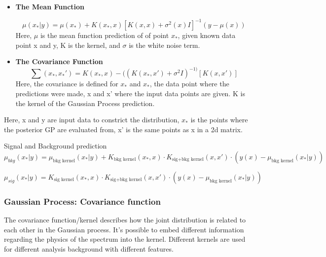     \begin{itemize}

        \item \textbf{The Mean Function}

    \begin{equation}
        \mu(x_{*}|y)  = \mu(x_{*})+ K(x_{*}, x)[K(x, x)+ \sigma^{2}(x)I]^{-1}(y-\mu(x))
    \end{equation}
    Here, $\mu$ is the mean function prediction of of point $x_{*}$, given known data point x and y, K is the kernel, and $\sigma$ is the white noise term.

    \item \textbf{The Covariance Function}
    \begin{equation}
        \sum(x_{*}, x_{*}') = K(x_{*}, x) - ((K(x_{*}, x')+\sigma^{2}I)^{-1)}[K(x, x')]
    \end{equation}  
    Here, the covariance is defined for $x_{*}$ and $x_{*}$, the data point where the predictions were made, x and x' where the input data points are given. K is the kernel of the Gaussian Process prediction.

    \end{itemize}

    Here, x and y are input data to constrict the distribution, $x_{*}$ is the points where the posterior GP are evaluated from, x' is the same points as x in a 2d matrix.

    Signal and Background prediction 
    \begin{equation}
        \mu_{bkg}(x_{*}|y) = \mu_{\textrm{bkg kernel}}(x_{*}|y)+K_{\textrm{bkg kernel}}(x_{*}, x) \cdot K_{\textrm{sig+bkg kernel}}(x,x') \cdot( y(x)-\mu_{\textrm{bkg kernel}}(x_{*}|y) )
    \end{equation}


    \begin{equation}
        \mu_{sig}(x_{*}|y) = K_{\textrm{sig kernel}}(x_{*}, x)\cdot K_{\textrm{sig+bkg kernel}}(x,x') \cdot ( y(x)-\mu_{\textrm{bkg kernel}}(x_{*}|y) )
    \end{equation}


\subsubsection{Gaussian Process: Covariance function}
\label{sec:kernel}
The covariance function/kernel describes how the joint distribution is related to each other in the Gaussian process. 
It's possible to embed different information regarding the physics of the spectrum into the kernel. 
Different kernels are used for different analysis background with different features. 

